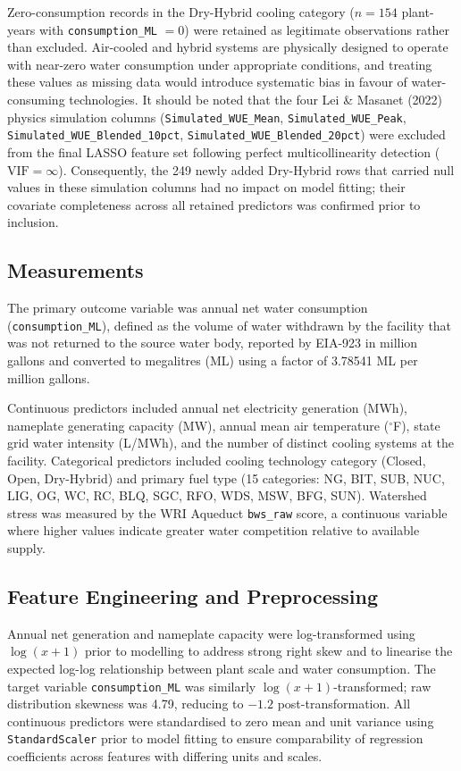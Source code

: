 \documentclass[11pt, letterpaper]{article}
\begin{document}
Zero-consumption records in the Dry-Hybrid cooling category ($n = 154$ plant-years with \texttt{consumption\_ML} $= 0$) were retained as legitimate observations rather than excluded. Air-cooled and hybrid systems are physically designed to operate with near-zero water consumption under appropriate conditions, and treating these values as missing data would introduce systematic bias in favour of water-consuming technologies. It should be noted that the four Lei \& Masanet (2022) physics simulation columns (\texttt{Simulated\_WUE\_Mean}, \texttt{Simulated\_WUE\_Peak}, \texttt{Simulated\_WUE\_Blended\_10pct}, \texttt{Simulated\_WUE\_Blended\_20pct}) were excluded from the final LASSO feature set following perfect multicollinearity detection ($\text{VIF} = \infty$). Consequently, the 249 newly added Dry-Hybrid rows that carried null values in these simulation columns had no impact on model fitting; their covariate completeness across all retained predictors was confirmed prior to inclusion.

\subsection{Measurements}

The primary outcome variable was annual net water consumption (\texttt{consumption\_ML}), defined as the volume of water withdrawn by the facility that was not returned to the source water body, reported by EIA-923 in million gallons and converted to megalitres (ML) using a factor of 3.78541 ML per million gallons.

Continuous predictors included annual net electricity generation (MWh), nameplate generating capacity (MW), annual mean air temperature ($^{\circ}$F), state grid water intensity (L/MWh), and the number of distinct cooling systems at the facility. Categorical predictors included cooling technology category (Closed, Open, Dry-Hybrid) and primary fuel type (15 categories: NG, BIT, SUB, NUC, LIG, OG, WC, RC, BLQ, SGC, RFO, WDS, MSW, BFG, SUN). Watershed stress was measured by the WRI Aqueduct \texttt{bws\_raw} score, a continuous variable where higher values indicate greater water competition relative to available supply.

\subsection{Feature Engineering and Preprocessing}

Annual net generation and nameplate capacity were log-transformed using $\log(x + 1)$ prior to modelling to address strong right skew and to linearise the expected log-log relationship between plant scale and water consumption. The target variable \texttt{consumption\_ML} was similarly $\log(x+1)$-transformed; raw distribution skewness was 4.79, reducing to $-1.2$ post-transformation. All continuous predictors were standardised to zero mean and unit variance using \texttt{StandardScaler} prior to model fitting to ensure comparability of regression coefficients across features with differing units and scales.
\end{document}

